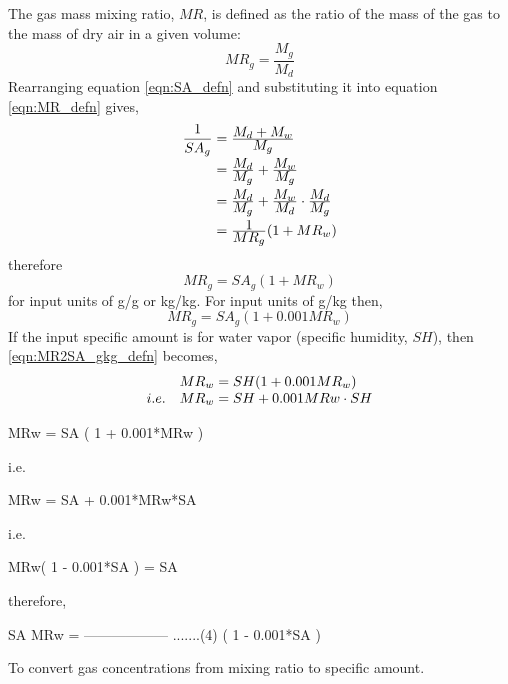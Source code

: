 The gas mass mixing ratio, $MR$, is defined as the ratio of the mass of the gas to the mass of dry air in a given volume:
\begin{equation}
  MR_g = \frac{M_g}{M_d}
  \label{eqn:MR_defn}
\end{equation}
Rearranging equation \ref{eqn:SA_defn} and substituting it into equation \ref{eqn:MR_defn} gives,
\begin{equation*}
  \begin{array}{c@{{}={}}l}
    \displaystyle
    \frac{\D 1}{\D SA_g} & \frac{\D M_d + M_w}{\D M_g}\\[0.1in]
                         & \frac{\D M_d}{\D M_g} + \frac{\D M_w}{\D M_g}\\[0.1in]
                         & \frac{\D M_d}{\D M_g} + \frac{\D M_w}{\D M_d}\cdot\frac{\D M_d}{\D M_g}\\[0.1in]
                         & \frac{\D 1}{\D MR_g}(1 + MR_w)
  \end{array}
\end{equation*}
therefore
\begin{equation}
  MR_g = SA_g(1 + MR_w)
  \label{eqn:MR2SA_defn}
\end{equation}
for input units of g/g or kg/kg. For input units of g/kg then,
\begin{equation}
  MR_g = SA_g(1 + 0.001MR_w)
  \label{eqn:MR2SA_gkg_defn}
\end{equation}
If the input specific amount is for water vapor (specific humidity, $SH$), then \ref{eqn:MR2SA_gkg_defn} becomes,
\begin{equation}
  \begin{array}{ll@{{}={}}l}
       & MR_w & SH(1 + 0.001MR_w)\\
  i.e. & MR_w & SH + 0.001MRw\cdot SH
  \end{array}
  \label{eqn:MR2SH_defn}
\end{equation}

         MRw = SA ( 1 + 0.001*MRw )

       i.e.

         MRw = SA + 0.001*MRw*SA

       i.e.

         MRw( 1 - 0.001*SA ) = SA

       therefore,

                      SA
         MRw = ------------------   .......(4)
                ( 1 - 0.001*SA )







To convert gas concentrations from mixing ratio to specific amount.
